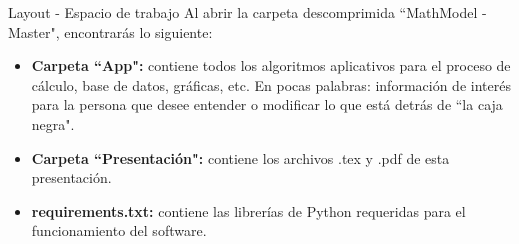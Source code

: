 \begin{frame}[t]{Layout - Espacio de trabajo}\vspace{5pt}
Al abrir la carpeta descomprimida ``MathModel - Master", encontrar\'as lo siguiente:

\begin{itemize}
	\item \textbf{Carpeta ``App":} contiene todos los algoritmos aplicativos para el proceso de c\'alculo, base de datos, gr\'aficas, etc. En pocas palabras: informaci\'on de inter\'es para la persona que desee entender o modificar lo que est\'a detr\'as de ``la caja negra".
	\item \textbf{Carpeta ``Presentaci\'on":} contiene los archivos .tex y .pdf de esta presentaci\'on.
	\item \textbf{requirements.txt:} contiene las librer\'ias de Python requeridas para el funcionamiento del software.
\end{itemize}

\end{frame}